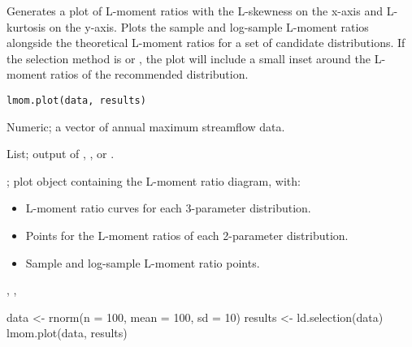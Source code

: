 \documentclass[a4paper]{book}
\begin{document}
%
\begin{Description}
Generates a plot of L-moment ratios with the L-skewness on the x-axis and L-kurtosis
on the y-axis. Plots the sample and log-sample L-moment ratios alongside the theoretical
L-moment ratios for a set of candidate distributions. If the selection method is
 or , the plot will include a small inset around
the L-moment ratios of the recommended distribution.
\end{Description}
%
\begin{Usage}
\begin{verbatim}
lmom.plot(data, results)
\end{verbatim}
\end{Usage}
%
\begin{Arguments}
\begin{ldescription}
\item[\code{data}] Numeric; a vector of annual maximum streamflow data.

\item[\code{results}] List; output of , ,
or .
\end{ldescription}
\end{Arguments}
%
\begin{Value}
; plot object containing the L-moment ratio diagram, with:
\begin{itemize}

\item{} L-moment ratio curves for each 3-parameter distribution.
\item{} Points for the L-moment ratios of each 2-parameter distribution.
\item{} Sample and log-sample L-moment ratio  points.

\end{itemize}

\end{Value}
%
\begin{SeeAlso}
, , 
\end{SeeAlso}
%
\begin{Examples}
\begin{ExampleCode}
data <- rnorm(n = 100, mean = 100, sd = 10)
results <- ld.selection(data)
lmom.plot(data, results)

\end{ExampleCode}
\end{Examples}
\end{document}
